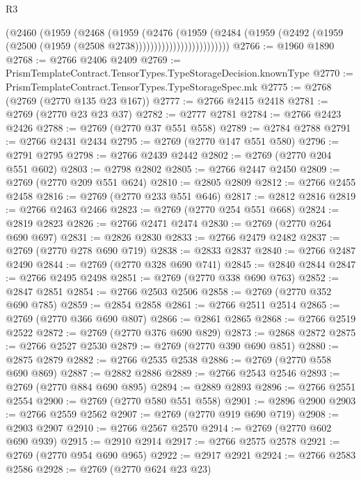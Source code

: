 \begin{lexlean}{R3}
\begin{coremodule}
                            (@2460
                              (@1959
                                (@2468
                                  (@1959
                                    (@2476
                                      (@1959
                                        (@2484
                                          (@1959
                                            (@2492
                                              (@1959
                                                (@2500 (@1959 (@2508 @2738)))))))))))))))))))))))))
@2766 := @1960 @1890
@2768 := @2766 @2406 @2409
@2769 := PrismTemplateContract.TensorTypes.TypeStorageDecision.knownType
@2770 := PrismTemplateContract.TensorTypes.TypeStorageSpec.mk
@2775 := @2768 (@2769 (@2770 @135 @23 @167))
@2777 := @2766 @2415 @2418
@2781 := @2769 (@2770 @23 @23 @37)
@2782 := @2777 @2781
@2784 := @2766 @2423 @2426
@2788 := @2769 (@2770 @37 @551 @558)
@2789 := @2784 @2788
@2791 := @2766 @2431 @2434
@2795 := @2769 (@2770 @147 @551 @580)
@2796 := @2791 @2795
@2798 := @2766 @2439 @2442
@2802 := @2769 (@2770 @204 @551 @602)
@2803 := @2798 @2802
@2805 := @2766 @2447 @2450
@2809 := @2769 (@2770 @209 @551 @624)
@2810 := @2805 @2809
@2812 := @2766 @2455 @2458
@2816 := @2769 (@2770 @233 @551 @646)
@2817 := @2812 @2816
@2819 := @2766 @2463 @2466
@2823 := @2769 (@2770 @254 @551 @668)
@2824 := @2819 @2823
@2826 := @2766 @2471 @2474
@2830 := @2769 (@2770 @264 @690 @697)
@2831 := @2826 @2830
@2833 := @2766 @2479 @2482
@2837 := @2769 (@2770 @278 @690 @719)
@2838 := @2833 @2837
@2840 := @2766 @2487 @2490
@2844 := @2769 (@2770 @328 @690 @741)
@2845 := @2840 @2844
@2847 := @2766 @2495 @2498
@2851 := @2769 (@2770 @338 @690 @763)
@2852 := @2847 @2851
@2854 := @2766 @2503 @2506
@2858 := @2769 (@2770 @352 @690 @785)
@2859 := @2854 @2858
@2861 := @2766 @2511 @2514
@2865 := @2769 (@2770 @366 @690 @807)
@2866 := @2861 @2865
@2868 := @2766 @2519 @2522
@2872 := @2769 (@2770 @376 @690 @829)
@2873 := @2868 @2872
@2875 := @2766 @2527 @2530
@2879 := @2769 (@2770 @390 @690 @851)
@2880 := @2875 @2879
@2882 := @2766 @2535 @2538
@2886 := @2769 (@2770 @558 @690 @869)
@2887 := @2882 @2886
@2889 := @2766 @2543 @2546
@2893 := @2769 (@2770 @884 @690 @895)
@2894 := @2889 @2893
@2896 := @2766 @2551 @2554
@2900 := @2769 (@2770 @580 @551 @558)
@2901 := @2896 @2900
@2903 := @2766 @2559 @2562
@2907 := @2769 (@2770 @919 @690 @719)
@2908 := @2903 @2907
@2910 := @2766 @2567 @2570
@2914 := @2769 (@2770 @602 @690 @939)
@2915 := @2910 @2914
@2917 := @2766 @2575 @2578
@2921 := @2769 (@2770 @954 @690 @965)
@2922 := @2917 @2921
@2924 := @2766 @2583 @2586
@2928 := @2769 (@2770 @624 @23 @23)

\end{coremodule}
\end{lexlean}
